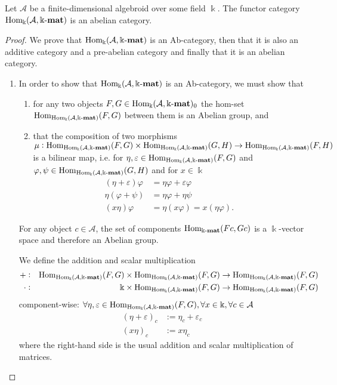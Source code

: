 \begin{theorem}
Let $\mathcal{A}$ be a finite-dimensional algebroid over some field $\Bbbk$. The functor category $\mathrm{Hom_{\Bbbk}}(\mathcal{A},\Bbbk\textnormal{-}\mathbf{mat})$
is an abelian category.
\end{theorem}
\begin{proof}
We prove that $\mathrm{Hom_{\Bbbk}}(\mathcal{A},\Bbbk\textnormal{-}\mathbf{mat})$ is an Ab-category, then that it is also an additive category and a pre-abelian category and finally that
it is an abelian category.
\begin{enumerate}
\renewcommand{\labelenumi}{(\theenumi)}
\item In order to show that $\mathrm{Hom_{\Bbbk}}(\mathcal{A},\Bbbk\textnormal{-}\mathbf{mat})$ is an Ab-category, we must show that 
\begin{enumerate}
\renewcommand{\labelenumii}{(\roman{enumii})}
\item for any two objects $F,G \in \mathrm{Hom_{\Bbbk}}(\mathcal{A},\Bbbk\textnormal{-}\mathbf{mat})_{0}$ the hom-set $\mathrm{Hom}_{\mathrm{Hom_{\Bbbk}}(\mathcal{A},\Bbbk\textnormal{-}\mathbf{mat})}(F,G)$ between them is an Abelian group, and
\item that the composition of two morphisms\\
$\mu : \mathrm{Hom}_{\mathrm{Hom_{\Bbbk}}(\mathcal{A},\Bbbk\textnormal{-}\mathbf{mat})}(F,G) \times \mathrm{Hom}_{\mathrm{Hom_{\Bbbk}}(\mathcal{A},\Bbbk\textnormal{-}\mathbf{mat})}(G,H) \rightarrow \mathrm{Hom}_{\mathrm{Hom_{\Bbbk}}(\mathcal{A},\Bbbk\textnormal{-}\mathbf{mat})}(F,H)$ is a
bilinear map, i.e. for $\eta, \varepsilon \in \mathrm{Hom}_{\mathrm{Hom_{\Bbbk}}(\mathcal{A},\Bbbk\textnormal{-}\mathbf{mat})}(F,G)$ and $\varphi, \psi \in \mathrm{Hom}_{\mathrm{Hom_{\Bbbk}}(\mathcal{A},\Bbbk\textnormal{-}\mathbf{mat})}(G,H)$ and
for $x \in \Bbbk$
\begin{align}
(\eta + \varepsilon)\varphi &= \eta\varphi + \varepsilon\varphi \\
\eta(\varphi + \psi) &= \eta\varphi + \eta\psi \\
(x\eta)\varphi &= \eta(x\varphi) = x(\eta\varphi).
\end{align}
\end{enumerate}

\begin{subproof}[Proof of (i)]
For any object $c \in \mathcal{A}$, the set of components $\mathrm{Hom}_{\Bbbk\textnormal{-}\mathbf{mat}}(Fc,Gc)$ is a $\Bbbk$-vector space and therefore an
Abelian group.

We define the addition and scalar multiplication
\begin{align*}
+ :&& \mathrm{Hom}_{\mathrm{Hom_{\Bbbk}}(\mathcal{A},\Bbbk\textnormal{-}\mathbf{mat})}(F,G) &\times \mathrm{Hom}_{\mathrm{Hom_{\Bbbk}}(\mathcal{A},\Bbbk\textnormal{-}\mathbf{mat})}(F,G) \rightarrow \mathrm{Hom}_{\mathrm{Hom_{\Bbbk}}(\mathcal{A},\Bbbk\textnormal{-}\mathbf{mat})}(F,G)\\
\cdot :&& \Bbbk &\times \mathrm{Hom}_{\mathrm{Hom_{\Bbbk}}(\mathcal{A},\Bbbk\textnormal{-}\mathbf{mat})}(F,G) \rightarrow \mathrm{Hom}_{\mathrm{Hom_{\Bbbk}}(\mathcal{A},\Bbbk\textnormal{-}\mathbf{mat})}(F,G)
\end{align*}
component-wise: $\forall \eta, \varepsilon \in \mathrm{Hom}_{\mathrm{Hom_{\Bbbk}}(\mathcal{A},\Bbbk\textnormal{-}\mathbf{mat})}(F,G), \forall x \in \Bbbk, \forall c \in \mathcal{A}$
\begin{align}
(\eta+\varepsilon)_{c} &:= \eta_{c} + \varepsilon_{c}\\
(x \eta)_{c} &:= x\eta_{c}
\end{align}
where the right-hand side is the usual addition and scalar multiplication of matrices.


\end{subproof}
\end{enumerate}
\end{proof}
